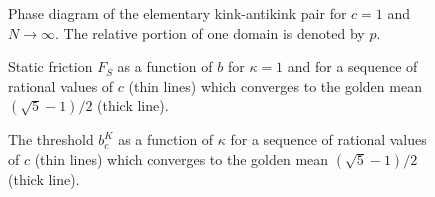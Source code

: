 \begin{figure}[htbp]
\caption[c1kink]{\protect\label{f.c1kink}
Phase diagram of the elementary kink-antikink pair for
$c=1$ and $N\to\infty$. The relative portion of one domain is denoted
by $p$.}
\end{figure}

\begin{figure}[htbp]
\caption[FS]{\protect\label{f.FS}
Static friction $F_S$ as a function of $b$ for $\kappa=1$ and for a
sequence of rational values of $c$ (thin lines) which converges to
the golden mean $(\sqrt{5}-1)/2$ (thick line).}
\end{figure}

\begin{figure}[htbp]
\caption[bck]{\protect\label{f.bck}
The threshold $b_c^K$ as a function of $\kappa$
for a sequence of rational values of $c$ (thin lines) which converges 
to the golden mean $(\sqrt{5}-1)/2$ (thick line).}
\end{figure}


